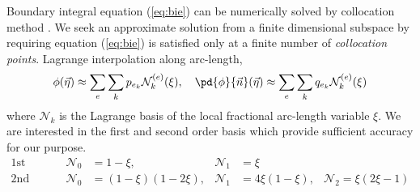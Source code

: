 \documentclass{jfm}
\begin{document}
Boundary integral equation (\ref{eq:bie}) can be numerically solved
by collocation method \citep{Kress13}.
We seek an approximate solution from a finite dimensional subspace by
requiring equation (\ref{eq:bie}) is satisfied only at a finite number of \textit{collocation points}.
Lagrange interpolation along arc-length,
\begin{equation}
\phi(\vec{\eta})\approx\sum_e \sum_k p_{e_k}\mathcal{N}^{(e)}_k(\xi),\quad
\pd{\phi}{\vec{n}}(\vec{\eta})\approx\sum_e \sum_kq_{e_k}\mathcal{N}^{(e)}_k(\xi)
\end{equation}
where $\mathcal{N}_k$ is the Lagrange basis of the local fractional arc-length variable $\xi$.
We are interested in the first and second order basis which provide sufficient accuracy for our purpose.
\begin{align}
\textrm{1st order:}&
&\mathcal{N}_0&=1 - \xi,
&\mathcal{N}_1 &= \xi
& \\
\textrm{2nd order:}&
&\mathcal{N}_0&=(1 - \xi) (1 - 2\xi),
&\mathcal{N}_1&=4 \xi (1 - \xi) ,
&\mathcal{N}_2=\xi (2 \xi- 1)
\end{align}
\end{document}
